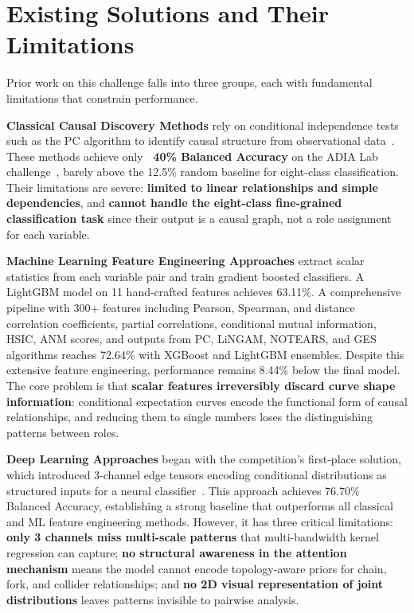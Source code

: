 \section{Existing Solutions and Their Limitations}
\label{sec:limitations}

Prior work on this challenge falls into three groups, each with fundamental limitations that constrain performance.

\textbf{Classical Causal Discovery Methods} rely on conditional independence tests such as the PC algorithm to identify causal structure from observational data~\cite{hasan2023survey_arxiv}. These methods achieve only \textbf{~40\% Balanced Accuracy} on the ADIA Lab challenge~\cite{olivetti2025adialab}, barely above the 12.5\% random baseline for eight-class classification. Their limitations are severe: \textbf{limited to linear relationships and simple dependencies}, and \textbf{cannot handle the eight-class fine-grained classification task} since their output is a causal graph, not a role assignment for each variable.

\textbf{Machine Learning Feature Engineering Approaches} extract scalar statistics from each variable pair and train gradient boosted classifiers. A LightGBM model on 11 hand-crafted features achieves 63.11\%. A comprehensive pipeline with 300+ features including Pearson, Spearman, and distance correlation coefficients, partial correlations, conditional mutual information, HSIC, ANM scores, and outputs from PC, LiNGAM, NOTEARS, and GES algorithms reaches 72.64\% with XGBoost and LightGBM ensembles. Despite this extensive feature engineering, performance remains 8.44\% below the final model. The core problem is that \textbf{scalar features irreversibly discard curve shape information}: conditional expectation curves encode the functional form of causal relationships, and reducing them to single numbers loses the distinguishing patterns between roles.

\textbf{Deep Learning Approaches} began with the competition's first-place solution, which introduced 3-channel edge tensors encoding conditional distributions as structured inputs for a neural classifier~\cite{adia_rank1_report}. This approach achieves 76.70\% Balanced Accuracy, establishing a strong baseline that outperforms all classical and ML feature engineering methods. However, it has three critical limitations: \textbf{only 3 channels miss multi-scale patterns} that multi-bandwidth kernel regression can capture; \textbf{no structural awareness in the attention mechanism} means the model cannot encode topology-aware priors for chain, fork, and collider relationships; and \textbf{no 2D visual representation of joint distributions} leaves patterns invisible to pairwise analysis.

